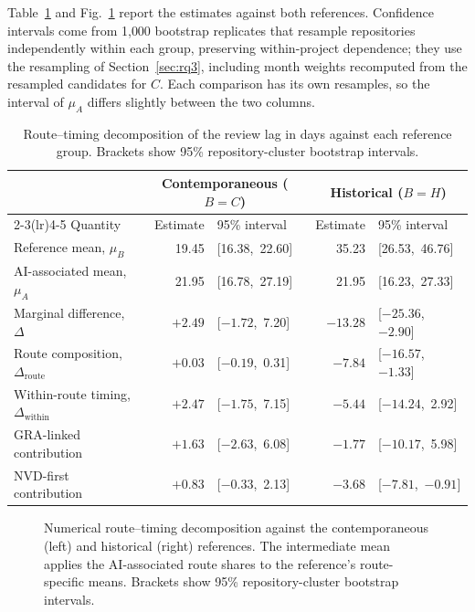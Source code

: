 \documentclass[smallextended,natbib]{svjour3}
\begin{document}
Table~\ref{tab:decomposition-results} and Fig.~\ref{fig:decomposition} report
the estimates against both references.  Confidence intervals come from 1{,}000
bootstrap replicates that resample repositories independently within each group,
preserving within-project dependence; they use the resampling of
Section~\ref{sec:rq3}, including month weights recomputed from the resampled
candidates for $C$.  Each comparison has its own resamples, so the interval of
$\mu_A$ differs slightly between the two columns.

\begin{table}[t]
\caption{Route--timing decomposition of the review lag in days against each
reference group.  Brackets show 95\% repository-cluster bootstrap intervals.}
\label{tab:decomposition-results}
\centering
\scriptsize
\setlength{\tabcolsep}{3pt}
\begin{tabular}{lrlrl}
\toprule
 & \multicolumn{2}{c}{Contemporaneous ($B=C$)} & \multicolumn{2}{c}{Historical ($B=H$)} \\
\cmidrule(lr){2-3}\cmidrule(lr){4-5}
Quantity & Estimate & 95\% interval & Estimate & 95\% interval \\
\midrule
Reference mean, $\mu_B$ & 19.45 & [16.38,\ 22.60] & 35.23 & [26.53,\ 46.76] \\
AI-associated mean, $\mu_A$ & 21.95 & [16.78,\ 27.19] & 21.95 & [16.23,\ 27.33] \\
Marginal difference, $\Delta$ & $+2.49$ & [$-1.72$,\ 7.20] & $-13.28$ & [$-25.36$,\ $-2.90$] \\
Route composition, $\Delta_{\mathrm{route}}$ & $+0.03$ & [$-0.19$,\ 0.31] & $-7.84$ & [$-16.57$,\ $-1.33$] \\
Within-route timing, $\Delta_{\mathrm{within}}$ & $+2.47$ & [$-1.75$,\ 7.15] & $-5.44$ & [$-14.24$,\ 2.92] \\
\quad GRA-linked contribution & $+1.63$ & [$-2.63$,\ 6.08] & $-1.77$ & [$-10.17$,\ 5.98] \\
\quad NVD-first contribution & $+0.83$ & [$-0.33$,\ 2.13] & $-3.68$ & [$-7.81$,\ $-0.91$] \\
\bottomrule
\end{tabular}
\end{table}

\begin{figure}[t]
\centering
\resizebox{\textwidth}{!}{}
\caption{Numerical route--timing decomposition against the contemporaneous
(left) and historical (right) references.  The intermediate mean applies the
AI-associated route shares to the reference's route-specific means.  Brackets
show 95\% repository-cluster bootstrap intervals.}
\label{fig:decomposition}
\end{figure}
\end{document}
